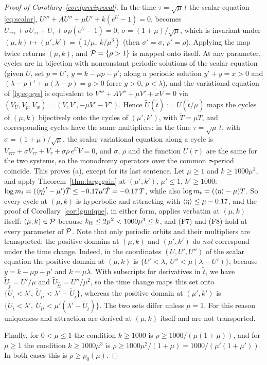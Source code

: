 \begin{proof}[Proof of Corollary~\ref{cor:lgreciprocal}]
In the time $\tau=\sqrt\mu\,t$ the scalar equation \eqref{eq:scalar}, $U'''+AU''+\mu U'+k(e^U-1)=0$, becomes
$U_{\tau\tau\tau}+\sigma U_{\tau\tau}+U_\tau+\sigma\rho(e^U-1)=0$, $\sigma=(1+\mu)/\sqrt\mu$, which is
invariant under $(\mu,k)\mapsto(\mu',k')=(1/\mu,\ k/\mu^3)$ (then $\sigma'=\sigma$, $\rho'=\rho$). Applying the map twice returns $(\mu,k)$, and $\mathcal P=\{\rho>1\}$ is mapped onto itself.
At any parameter, cycles are in bijection with nonconstant periodic solutions of the scalar equation
(given $U$, set $p=U'$, $y=k-\mu p-p'$; along a periodic solution $y'+y=x>0$ and
$(\lambda-p)'+\mu(\lambda-p)=y>0$ force $y>0$, $p<\lambda$), and the variational equation of
\eqref{lg:eq:sys} is equivalent to $V'''+AV''+\mu V'+xV=0$ via
$(V_U,V_p,V_w)=(V,V',-\mu V'-V'')$. Hence $\tilde U(\tilde t):=U(\tilde t/\mu)$ maps the
cycles of $(\mu,k)$ bijectively onto the cycles of $(\mu',k')$, with $\tilde T=\mu T$, and corresponding
cycles have the same multipliers: in the time $\tau=\sqrt\mu\,t$, with $\sigma=(1+\mu)/\sqrt\mu$, the scalar variational equation along a cycle is $V_{\tau\tau\tau}+\sigma V_{\tau\tau}+V_\tau+\sigma\rho\,e^{U}V=0$, and $\sigma$, $\rho$ and the function $U(\tau)$ are the same for the two systems, so the monodromy operators over the common $\tau$-period coincide. This proves \textup{(a)}, except for its last sentence. Let
$\mu\ge1$ and $k\ge1000\mu^3$, and apply Theorem~\ref{thm:largegain} at $(\mu',k')$, $\mu'\le1$, $k'\ge1000$:
$\log m_t=(\left\langle \eta\right\rangle'-\mu')\tilde T\le-0.17\mu'\tilde T=-0.17\,T$, while also
$\log m_t=(\left\langle \eta\right\rangle-\mu)T$. So every cycle at $(\mu,k)$ is hyperbolic and attracting with
$\left\langle \eta\right\rangle\le\mu-0.17$, and the proof of Corollary~\ref{cor:lgunique}, in either form, applies verbatim at $(\mu,k)$ itself:
$(\mu,k)\in\mathcal P$ because $k_{\mathrm H}\le2\mu^2<1000\mu^3\le k$, and (F7) and (F8) hold at every parameter of $\mathcal P$. Note that only periodic orbits and their multipliers are transported:
the positive domains at $(\mu,k)$ and $(\mu',k')$ do \emph{not} correspond under the time change.
Indeed, in the coordinates $(U,U',U'')$ of the scalar equation the positive domain at $(\mu,k)$ is $\{U'<\lambda,\ U''<\mu(\lambda-U')\}$, because $y=k-\mu p-p'$ and $k=\mu\lambda$. With subscripts for derivatives in $\tilde t$, we have $\tilde U_{\tilde t}=U'/\mu$ and $\tilde U_{\tilde t\tilde t}=U''/\mu^2$, so the time change maps this set onto $\{\tilde U_{\tilde t}<\lambda',\ \tilde U_{\tilde t\tilde t}<\lambda'-\tilde U_{\tilde t}\}$, whereas the positive domain at $(\mu',k')$ is $\{\tilde U_{\tilde t}<\lambda',\ \tilde U_{\tilde t\tilde t}<\mu'(\lambda'-\tilde U_{\tilde t})\}$. The two sets differ unless $\mu=1$. For this reason uniqueness and attraction are derived at $(\mu,k)$ itself and are not transported.

Finally, for $0<\mu\le1$ the condition $k\ge1000$ is $\rho\ge1000/(\mu(1+\mu))$, and for $\mu\ge1$ the condition $k\ge1000\mu^3$ is $\rho\ge1000\mu^2/(1+\mu)=1000/(\mu'(1+\mu'))$. In both cases this is $\rho\ge\rho_0(\mu)$.
\end{proof}

